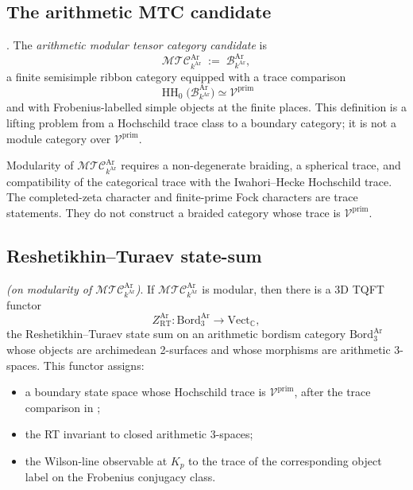 \subsection{The arithmetic MTC candidate}
\label{v4-arith:w10-a:arith-MTC}

\begin{definition}
\label{v4-arith:w10-a:def:arith-MTC}
\ClaimStatusDefinitional. The \emph{arithmetic modular tensor
category candidate} is
\[
\mathcal{MTC}^{\mathrm{Ar}}_{k^{\mathrm{Ar}}}
\;:=\;
\mathcal B^{\mathrm{Ar}}_{k^{\mathrm{Ar}}},
\]
a finite semisimple ribbon category equipped with a trace comparison
\[
        \operatorname{HH}_{0}
        \bigl(\mathcal B^{\mathrm{Ar}}_{k^{\mathrm{Ar}}}\bigr)
        \simeq
        \mathcal V^{\mathrm{prim}}
\]
and with Frobenius-labelled simple objects at the finite places. This
definition is a lifting problem from a Hochschild trace class to a
boundary category; it is not a module category over
\(\mathcal V^{\mathrm{prim}}\).
\end{definition}

\begin{remark}
\label{v4-arith:w10-a:rem:modularity-cond}
Modularity of \(\mathcal{MTC}^{\mathrm{Ar}}_{k^{\mathrm{Ar}}}\)
requires a non-degenerate braiding, a spherical trace, and compatibility
of the categorical trace with the Iwahori--Hecke Hochschild trace.
The completed-zeta character and finite-prime Fock characters are trace
statements. They do not construct a braided category whose trace is
\(\mathcal V^{\mathrm{prim}}\).
\end{remark}

\subsection{Reshetikhin--Turaev state-sum}
\label{v4-arith:w10-a:RT-state-sum}

\begin{theorem}
\label{v4-arith:w10-a:thm:RT-construction}
\ClaimStatusProvedHereConditional \emph{(on modularity of
\(\mathcal{MTC}^{\mathrm{Ar}}_{k^{\mathrm{Ar}}}\))}. If
\(\mathcal{MTC}^{\mathrm{Ar}}_{k^{\mathrm{Ar}}}\) is modular, then
there is a 3D TQFT functor
\[
Z_{\mathrm{RT}}^{\mathrm{Ar}}:\mathrm{Bord}_{3}^{\mathrm{Ar}}\to\mathrm{Vect}_{\mathbb C},
\]
the Reshetikhin--Turaev state sum on an arithmetic bordism
category \(\mathrm{Bord}_{3}^{\mathrm{Ar}}\) whose objects are
archimedean 2-surfaces and whose morphisms are arithmetic
3-spaces. This functor assigns:
\begin{itemize}
\item a boundary state space whose Hochschild trace is
\(\mathcal V^{\mathrm{prim}}\), after the trace comparison in
;
\item the RT invariant to closed arithmetic 3-spaces;
\item the Wilson-line observable at \(K_{p}\) to the trace of the
corresponding object label on the Frobenius conjugacy class.
\end{itemize}
\end{theorem}

